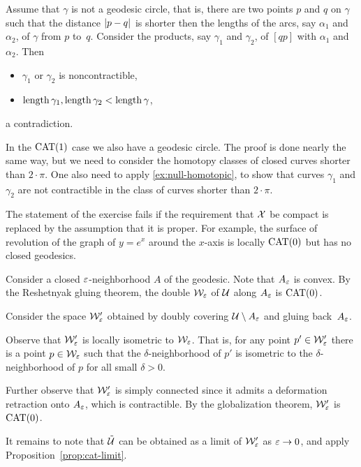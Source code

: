 Assume that $\gamma$ is not a geodesic circle,
that is,  there are two points $p$ and $q$ on $\gamma$ such that the distance $\dist{p}{q}{}$ 
is shorter then the lengths of the arcs, say $\alpha_1$ and $\alpha_2$, of $\gamma$ from $p$ to~$q$.
Consider the products, say $\gamma_1$ and $\gamma_2$,
of $[qp]$ with $\alpha_1$ and~$\alpha_2$.
Then
\begin{itemize}
 \item  $\gamma_1$ or $\gamma_2$ is noncontractible,
 \item $\mathop{\rm length}\nolimits\gamma_1, \mathop{\rm length}\nolimits\gamma_2<\mathop{\rm length}\nolimits \gamma$,
\end{itemize}
a contradiction.

In the $\mathrm{CAT}(1)$ case we also have a geodesic circle.
The proof is done nearly the same way, but we need to consider the homotopy classes of closed curves shorter than $2\cdot \pi$.
One also need to apply \ref{ex:null-homotopic}, to show that curves $\gamma_1$ and $\gamma_2$ are not contractible in the class of curves shorter than $2\cdot \pi$.

The statement of the exercise fails if the requirement that $\mathcal{X}$ be compact is replaced by the assumption that it is proper.
For example, the surface of revolution of the graph of $y=e^x$ around the $x$-axis is locally $\mathrm{CAT}(0)$ but has no closed geodesics.


Consider a closed $\varepsilon$-neighborhood $A$ of the geodesic.
Note that $A_\varepsilon$ is convex.
By the Reshetnyak gluing theorem, the double $\mathcal{W}_\varepsilon$ of $\mathcal{U}$ along $A_\varepsilon$ is $\mathrm{CAT}(0)$.

Consider the space $\mathcal{W}'_\varepsilon$ obtained by doubly covering $\mathcal{U}\setminus A_\varepsilon$ and gluing back~$A_\varepsilon$.

Observe that $\mathcal{W}'_\varepsilon$ is locally isometric to $\mathcal{W}_\varepsilon$. 
That is, for any point $p'\in\mathcal{W}'_\varepsilon$ there is a point $p\in\mathcal{W}_\varepsilon$ such that the $\delta$-neighborhood of $p'$ is isometric to the $\delta$-neighborhood of $p$ for all small $\delta>0$.

Further observe that $\mathcal{W}'_\varepsilon$ is simply connected since it admits a deformation retraction onto $A_\varepsilon$, which is contractible.
By the globalization theorem, $\mathcal{W}'_\varepsilon$ is $\mathrm{CAT}(0)$.

It remains to note that $\tilde {\mathcal{U}}$ can be obtained as a limit of $\mathcal{W}'_\varepsilon$ as $\varepsilon\to 0$, and apply Proposition~\ref{prop:cat-limit}.

\setcounter{eqtn}{0}

